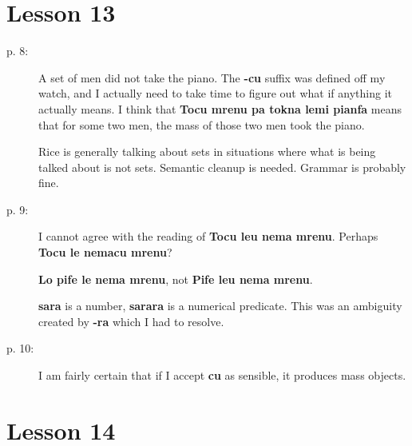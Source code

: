 \documentclass[12pt]{article}
\begin{document}
\section{Lesson 13}

\begin{description}

\item[p. 8:]   A set of men did not take the piano.  The {\bf -cu} suffix was defined off my watch, and I actually need to take time to figure out what if anything it actually means.  I think that {\bf Tocu mrenu pa tokna lemi pianfa} means that for some two men, the mass of those two men took the piano.

Rice is generally talking about sets in situations where what is being talked about is not sets.  Semantic cleanup is needed.  Grammar is probably fine.

\item[p. 9:]  I cannot agree with the reading of {\bf Tocu leu nema mrenu}.  Perhaps {\bf Tocu le nemacu mrenu}?

{\bf Lo pife le nema mrenu}, not {\bf Pife leu nema mrenu}.

{\bf sara} is a number, {\bf sarara} is a numerical predicate.  This was an ambiguity created by {\bf -ra} which I had to resolve.

\item[p. 10:]  I am fairly certain that if I accept {\bf cu} as sensible, it produces mass objects.



\end{description}

\section{Lesson 14}
\end{document}

